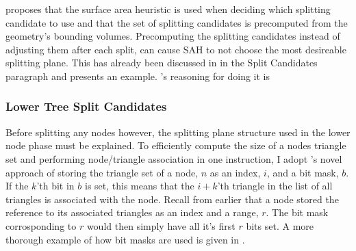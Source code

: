 \zhou{} proposes that the surface area heuristic is used when deciding
which splitting candidate to use and that the set of splitting
candidates is precomputed from the geometry's bounding
volumes. Precomputing the splitting candidates instead of adjusting
them after each split, can cause SAH to not choose the most desireable
splitting plane. This has already been discussed in
 in the Split Candidates paragraph and
 presents an example. \zhou's reasoning for
doing it is



\subsubsection{Lower Tree Split Candidates}


Before splitting any nodes however, the splitting plane structure used
in the lower node phase must be explained. To efficiently compute the
size of a nodes triangle set and performing node/triangle association
in one instruction, I adopt \zhou's novel approach of storing the
triangle set of a node, $n$ as an index, $i$, and a bit mask, $b$. If
the $k$'th bit in $b$ is set, this means that the $i+k$'th triangle in
the list of all triangles is associated with the node. Recall from
earlier that a node stored the reference to its associated triangles
as an index and a range, $r$. The bit mask corrosponding to $r$ would
then simply have all it's first $r$ bits set. A more thorough example
of how bit masks are used is given in .

\newcommand{\nodeBitmap}[5]{
  \begin{tabular}{c}
    #1 \\ 
    \begin{tikzpicture}[y=0.4cm, x=.4cm,font=\sffamily]
      \draw (0,0) -- (4,0);
      \draw (0,1) -- (4,1);
      \draw (0,0) -- (0,1);
      \draw (1,0) -- (1,1);
      \draw (2,0) -- (2,1);
      \draw (3,0) -- (3,1);
      \draw (4,0) -- (4,1);
      
      #2
      #3
      #4
      #5
    \end{tikzpicture}
  \end{tabular}
}

